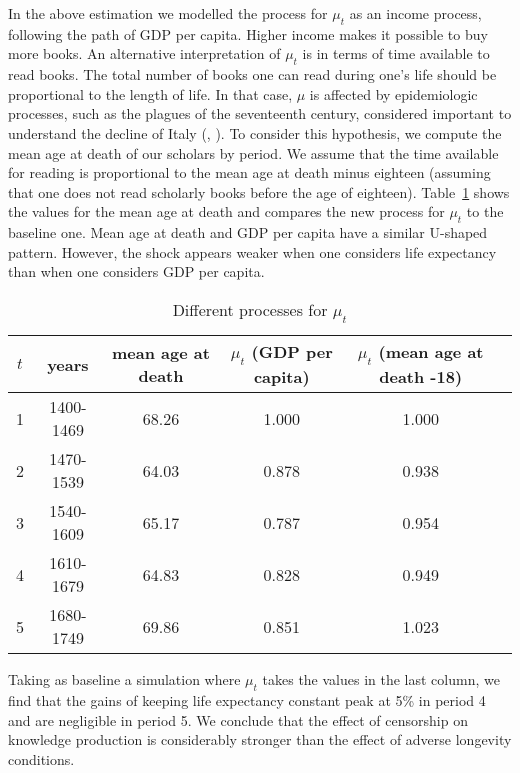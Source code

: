 In the above estimation we modelled the process for $\mu_t$ as an income process, following the path of GDP per capita. Higher income makes it possible to buy more books. An alternative interpretation of $\mu_t$ is in terms of time available to read books. The total number of books one can read during one's life should be proportional to the length of life. In that case, $\mu$ is affected by epidemiologic processes, such as the plagues of the seventeenth century, considered important to understand the decline of Italy (, ). To consider this hypothesis, we compute the mean age at death of our scholars by period. We assume that the time available for reading is proportional to the mean age at death minus eighteen (assuming that one does not read scholarly books before the age of eighteen). Table~\ref{tab:mu} shows the values for the mean age at death and compares the new process for $\mu_t$ to the baseline one. Mean age at death and GDP per capita have a similar U-shaped pattern. However, the shock appears weaker when one considers life expectancy than when one considers GDP per capita.

\begin{table}[htb]
      \centering %
\begin{tabular}{cccccc}
\toprule
$t$         &   years   & mean age at death   & $\mu_t$ (GDP per capita) & $\mu_t$ (mean age at death -18) \\
\midrule
1           & 1400-1469  & 68.26     & 1.000   &  1.000\\
2           & 1470-1539  & 64.03     &  0.878  &  0.938\\
3           & 1540-1609  & 65.17     & 0.787   &  0.954\\
4           & 1610-1679  & 64.83     & 0.828  &   0.949\\
5           & 1680-1749  & 69.86     & 0.851   &  1.023\\
\bottomrule
\end{tabular}
\caption{Different processes for $\mu_t$}\label{tab:mu}
\end{table}

Taking as baseline a simulation where $\mu_t$ takes the values in the last column, we find that  the gains of keeping life expectancy constant peak at 5\% in period 4 and are negligible in period 5. We  conclude  that the effect of censorship on knowledge production is considerably stronger than the effect of adverse longevity conditions.

